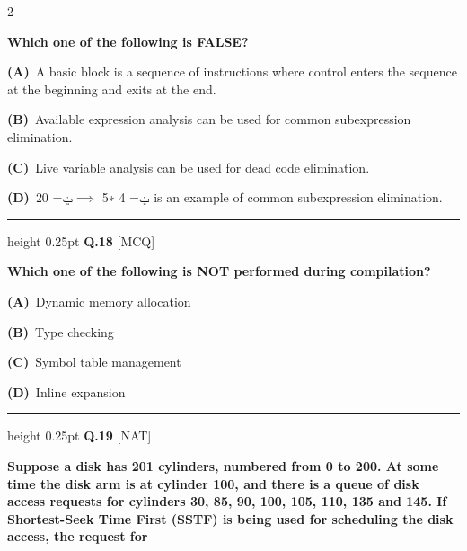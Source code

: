 \documentclass[a4paper,10pt,twoside]{article}
\begin{document}
\begin{multicols}{2}
\par\vspace{2pt}
{\bfseries Which one of the following is FALSE? \par}
\par\vspace{2pt}\noindent
\textbf{(A)}~A basic block is a sequence of instructions where control enters the sequence at the beginning \newline and exits at the end.\par\vspace{2pt}\noindent
\textbf{(B)}~Available expression analysis can be used for common subexpression elimination.\par\vspace{2pt}\noindent
\textbf{(C)}~Live variable analysis can be used for dead code elimination.\par\vspace{2pt}\noindent
\textbf{(D)}~ݔ= 4 ∗5 $\implies$ݔ= 20 is an example of common subexpression elimination.
\par\vspace{6pt}\hrule height 0.25pt\vspace{6pt}
\noindent\textbf{Q.18} \hfill {\footnotesize\textsf{[MCQ]}}
\par\vspace{2pt}
{\bfseries Which one of the following is NOT performed during compilation? \par}
\par\vspace{2pt}\noindent
\textbf{(A)}~Dynamic memory allocation\par\vspace{2pt}\noindent
\textbf{(B)}~Type checking\par\vspace{2pt}\noindent
\textbf{(C)}~Symbol table management\par\vspace{2pt}\noindent
\textbf{(D)}~Inline expansion
\par\vspace{6pt}\hrule height 0.25pt\vspace{6pt}
\noindent\textbf{Q.19} \hfill {\footnotesize\textsf{[NAT]}}
\par\vspace{2pt}
{\bfseries Suppose a disk has 201 cylinders, numbered from 0 to 200. At some time the disk arm is at cylinder
100, and there is a queue of disk access requests for cylinders 30, 85, 90, 100, 105, 110, 135 and
145. If Shortest-Seek Time First (SSTF) is being used for scheduling the disk access, the request for
}
\end{multicols}
\end{document}
